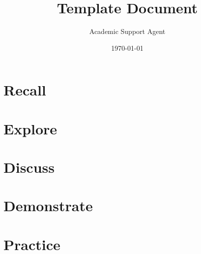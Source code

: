 \documentclass{article}
\title{Template Document}
\author{Academic Support Agent}
\date{\today}
\begin{document}
\maketitle

\maketitle
\thispagestyle{first}

\section*{Recall} %

\section*{Explore}

\section*{Discuss}

\section*{Demonstrate}

\section*{Practice}
\end{document}

